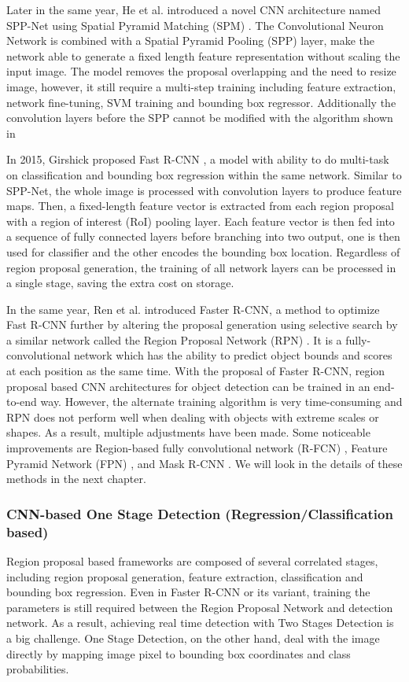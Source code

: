 Later in the same year, He et al. introduced a novel CNN architecture named SPP-Net \cite{29} using Spatial Pyramid Matching (SPM) \cite{30,31}. The Convolutional Neuron Network is combined with a Spatial Pyramid Pooling (SPP) layer, make the network able to generate a fixed length feature representation without scaling the input image. The model removes the proposal overlapping and the need to resize image, however, it still require a multi-step training including feature extraction, network fine-tuning, SVM training and bounding box regressor. Additionally the convolution layers before the SPP cannot be modified with the algorithm shown in \cite{29}
    
In 2015, Girshick proposed Fast R-CNN \cite{32}, a model with ability to do multi-task on classification and bounding box regression within the same network. Similar to SPP-Net, the whole image is processed with convolution layers to produce feature maps. Then, a fixed-length feature vector is extracted from each region proposal with a region of interest (RoI) pooling layer. Each feature vector is then fed into a sequence of fully connected layers before branching into two output, one is then used for classifier and the other encodes the bounding box location. Regardless of region proposal generation, the training of all network layers can be processed in a single stage, saving the extra cost on storage. 
    
In the same year, Ren et al. introduced Faster R-CNN, a method to optimize Fast R-CNN further by altering the proposal generation using selective search by a similar network called the Region Proposal Network (RPN) \cite{33}. It is a fully-convolutional network which has the ability to predict object bounds and scores at each position as the same time. With the proposal of Faster R-CNN, region proposal based CNN architectures for object detection can be trained
in an end-to-end way. However, the alternate training algorithm is very time-consuming and RPN does not perform well when dealing with objects with extreme scales or shapes. As a result, multiple adjustments have been made. Some noticeable improvements are Region-based fully convolutional network (R-FCN) \cite{34}, Feature Pyramid Network (FPN) \cite{35}, and Mask R-CNN \cite{36}. We will look in the details of these methods in the next chapter.

\subsubsection{CNN-based One Stage Detection (Regression/Classification based)}
Region proposal based frameworks are composed of several correlated stages, including region proposal generation, feature extraction, classification and bounding box regression. Even in Faster R-CNN or its variant, training the parameters is still required between the Region Proposal Network and detection network. As a result, achieving real time detection with Two Stages Detection is a big challenge. One Stage Detection, on the other hand, deal with the image directly by mapping image pixel to bounding box coordinates and class probabilities. 

